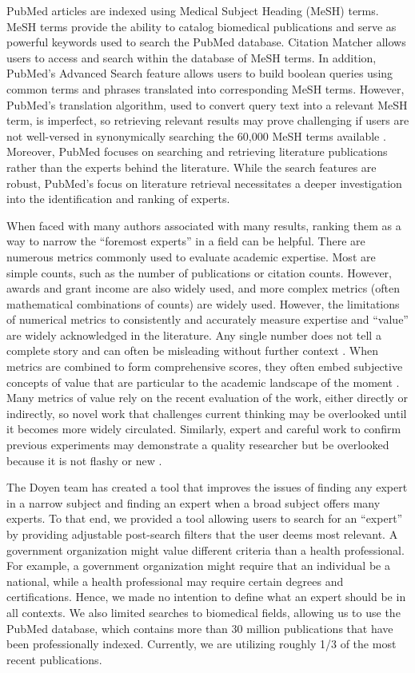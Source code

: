 PubMed articles are indexed using Medical Subject Heading (MeSH) terms. MeSH terms provide the ability to catalog biomedical publications and serve as powerful keywords used to search the PubMed database. Citation Matcher allows users to access and search within the database of MeSH terms. In addition, PubMed's Advanced Search feature allows users to build boolean queries using common terms and phrases translated into corresponding MeSH terms. However, PubMed's translation algorithm, used to convert query text into a relevant MeSH term, is imperfect, so retrieving relevant results may prove challenging if users are not well-versed in synonymically searching the 60,000 MeSH terms available \cite{ref-pubmed-updated}. Moreover, PubMed focuses on searching and retrieving literature publications rather than the experts behind the literature. While the search features are robust, PubMed's focus on literature retrieval necessitates a deeper investigation into the identification and ranking of experts. 

When faced with many authors associated with many results, ranking them as a way to narrow the ``foremost experts'' in a field can be helpful. There are numerous metrics commonly used to evaluate academic expertise. Most are simple counts, such as the number of publications or citation counts. However, awards and grant income are also widely used, and more complex metrics (often mathematical combinations of counts) are widely used. However, the limitations of numerical metrics to consistently and accurately measure expertise and ``value'' are widely acknowledged in the literature. Any single number does not tell a complete story and can often be misleading without further context \cite{ref-metrics-stack-overflow}. When metrics are combined to form comprehensive scores, they often embed subjective concepts of value that are particular to the academic landscape of the moment \cite{ref-metrics-neoliberalism}. Many metrics of value rely on the recent evaluation of the work, either directly or indirectly, so novel work that challenges current thinking may be overlooked until it becomes more widely circulated. Similarly, expert and careful work to confirm previous experiments may demonstrate a quality researcher but be overlooked because it is not flashy or new \cite{ref-metrics-games-academics-play}.

The Doyen team has created a tool that improves the issues of finding any expert in a narrow subject and finding an expert when a broad subject offers many experts. To that end, we provided a tool allowing users to search for an ``expert'' by providing adjustable post-search filters that the user deems most relevant. A government organization might value different criteria than a health professional. For example, a government organization might require that an individual be a national, while a health professional may require certain degrees and certifications. Hence, we made no intention to define what an expert should be in all contexts. We also limited searches to biomedical fields, allowing us to use the PubMed database, which contains more than 30 million publications that have been professionally indexed. Currently, we are utilizing roughly 1/3 of the most recent publications. 


